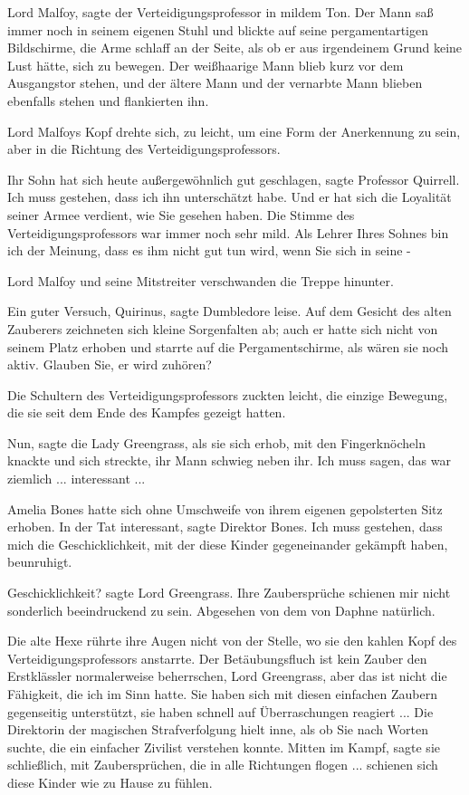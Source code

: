\glqq{}Lord Malfoy\grqq{}, sagte der Verteidigungsprofessor in mildem Ton. Der
Mann saß immer noch in seinem eigenen Stuhl und blickte auf seine
pergamentartigen Bildschirme, die Arme schlaff an der Seite, als ob er aus
irgendeinem Grund keine Lust hätte, sich zu bewegen. Der weißhaarige Mann blieb
kurz vor dem Ausgangstor stehen, und der ältere Mann und der vernarbte Mann
blieben ebenfalls stehen und flankierten ihn.

Lord Malfoys Kopf drehte sich, zu leicht, um eine Form der Anerkennung zu sein,
aber in die Richtung des Verteidigungsprofessors.

\glqq{}Ihr Sohn hat sich heute außergewöhnlich gut geschlagen\grqq{}, sagte
Professor Quirrell. \glqq{}Ich muss gestehen, dass ich ihn unterschätzt habe. Und
er hat sich die Loyalität seiner Armee verdient, wie Sie gesehen haben.\grqq{}
Die Stimme des Verteidigungsprofessors war immer noch sehr mild. \glqq{}Als
Lehrer Ihres Sohnes bin ich der Meinung, dass es ihm nicht gut tun wird, wenn
Sie sich in seine -\grqq{}

Lord Malfoy und seine Mitstreiter verschwanden die Treppe hinunter.

\glqq{}Ein guter Versuch, Quirinus\grqq{}, sagte Dumbledore leise. Auf dem
Gesicht des alten Zauberers zeichneten sich kleine Sorgenfalten ab; auch er
hatte sich nicht von seinem Platz erhoben und starrte auf die Pergamentschirme,
als wären sie noch aktiv. \glqq{}Glauben Sie, er wird zuhören?\grqq{}

Die Schultern des Verteidigungsprofessors zuckten leicht, die einzige Bewegung,
die sie seit dem Ende des Kampfes gezeigt hatten.

\glqq{}Nun\grqq{}, sagte die Lady Greengrass, als sie sich erhob, mit den
Fingerknöcheln knackte und sich streckte, ihr Mann schwieg neben ihr. \glqq{}Ich
muss sagen, das war ziemlich ... interessant ...\grqq{}

Amelia Bones hatte sich ohne Umschweife von ihrem eigenen gepolsterten Sitz
erhoben. \glqq{}In der Tat interessant\grqq{}, sagte Direktor Bones. \glqq{}Ich
muss gestehen, dass mich die Geschicklichkeit, mit der diese Kinder
gegeneinander gekämpft haben, beunruhigt.\grqq{}

\glqq{}Geschicklichkeit?\grqq{} sagte Lord Greengrass. \glqq{}Ihre Zaubersprüche
schienen mir nicht sonderlich beeindruckend zu sein. Abgesehen von dem von
Daphne natürlich.\grqq{}

Die alte Hexe rührte ihre Augen nicht von der Stelle, wo sie den kahlen Kopf des
Verteidigungsprofessors anstarrte. \glqq{}Der Betäubungsfluch ist kein Zauber den
Erstklässler normalerweise beherrschen, Lord Greengrass, aber das ist nicht die
Fähigkeit, die ich im Sinn hatte. Sie haben sich mit diesen einfachen Zaubern
gegenseitig unterstützt, sie haben schnell auf Überraschungen reagiert
...\grqq{} Die Direktorin der magischen Strafverfolgung hielt inne, als ob Sie
nach Worten suchte, die ein einfacher Zivilist verstehen konnte. \glqq{}Mitten im
Kampf\grqq{}, sagte sie schließlich, \glqq{}mit Zaubersprüchen, die in alle
Richtungen flogen ... schienen sich diese Kinder wie zu Hause zu fühlen.\grqq{}

